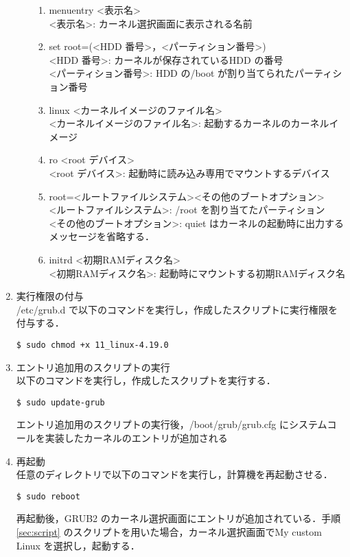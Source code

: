 \documentclass[12pt]{jsarticle}
\begin{document}
\begin{enumerate}
\begin{enumerate}
\begin{enumerate}
\item menuentry \textless 表示名\textgreater \\
  \textless 表示名\textgreater : カーネル選択画面に表示される名前
\item set root=(\textless HDD 番号\textgreater ，\textless パーティション番号\textgreater )\\
  \textless HDD 番号\textgreater : カーネルが保存されているHDD の番号\\
  \textless パーティション番号\textgreater : HDD の/boot が割り当てられたパーティション番号
\item linux \textless カーネルイメージのファイル名\textgreater \\
  \textless カーネルイメージのファイル名\textgreater : 起動するカーネルのカーネルイメージ
\item ro \textless root デバイス\textgreater \\
  \textless root デバイス\textgreater : 起動時に読み込み専用でマウントするデバイス
\item root=\textless ルートファイルシステム\textgreater  \textless その他のブートオプション\textgreater \\
  \textless ルートファイルシステム\textgreater : /root を割り当てたパーティション\\
  \textless その他のブートオプション\textgreater : quiet はカーネルの起動時に出力するメッセージを省略する．
\item initrd \textless 初期RAMディスク名\textgreater \\
  \textless 初期RAMディスク名\textgreater : 起動時にマウントする初期RAMディスク名
\end{enumerate}
  \end{enumerate}
\item 実行権限の付与\\
  /etc/grub.d で以下のコマンドを実行し，作成したスクリプトに実行権限を付与する．
\begin{verbatim}
$ sudo chmod +x 11_linux-4.19.0
\end{verbatim}
\item エントリ追加用のスクリプトの実行\\
  以下のコマンドを実行し，作成したスクリプトを実行する．
\begin{verbatim}
$ sudo update-grub
\end{verbatim}
エントリ追加用のスクリプトの実行後，/boot/grub/grub.cfg にシステムコールを実装したカーネルのエントリが追加される
\item 再起動\\
  任意のディレクトリで以下のコマンドを実行し，計算機を再起動させる．
\begin{verbatim}
$ sudo reboot
\end{verbatim}
再起動後，GRUB2 のカーネル選択画面にエントリが追加されている．手順\ref{sec:script} のスクリプトを用いた場合，カーネル選択画面でMy custom Linux を選択し，起動する．
\end{enumerate}
\end{document}
